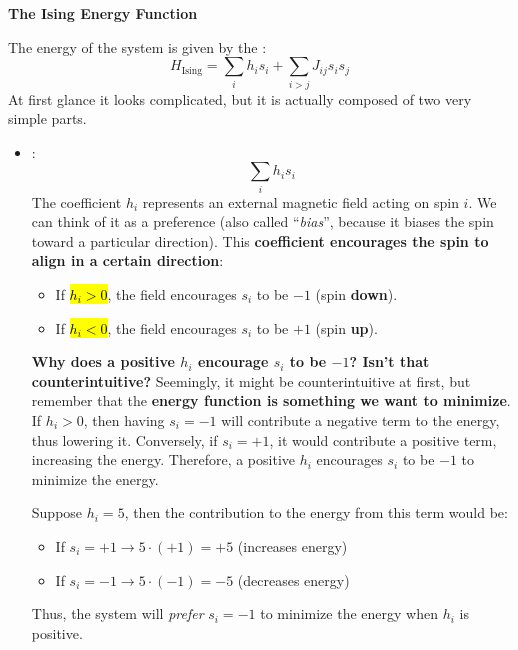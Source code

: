 \highspace
\begin{flushleft}
    \textcolor{Green3}{ \textbf{The Ising Energy Function}}
\end{flushleft}
The energy of the system is given by the :
\begin{equation}\label{eq:ising-energy-function}
    H_{\text{Ising}} = \sum_i h_i s_i + \sum_{i>j} J_{ij} s_i s_j
\end{equation}
At first glance it looks complicated, but it is actually composed of two very simple parts.
\begin{itemize}
    \item {}:
    \begin{equation*}
        \sum_i h_i s_i
    \end{equation*}
    The coefficient $h_i$ represents an external magnetic field acting on spin $i$. We can think of it as a preference (also called ``\emph{bias}'', because it biases the spin toward a particular direction). This \textbf{coefficient encourages the spin to align in a certain direction}:
    \begin{itemize}
        \item If \hl{$h_i > 0$}, the field encourages $s_i$ to be $-1$ (spin \textbf{down}).
        \item If \hl{$h_i < 0$}, the field encourages $s_i$ to be $+1$ (spin \textbf{up}).
    \end{itemize}
    \textcolor{Green3}{ \textbf{Why does a positive $h_i$ encourage $s_i$ to be $-1$? Isn't that counterintuitive?}} Seemingly, it might be counterintuitive at first, but remember that the \textbf{energy function is something we want to minimize}. If $h_i > 0$, then having $s_i = -1$ will contribute a negative term to the energy, thus lowering it. Conversely, if $s_i = +1$, it would contribute a positive term, increasing the energy. Therefore, a positive $h_i$ encourages $s_i$ to be $-1$ to minimize the energy.

    Suppose $h_i = 5$, then the contribution to the energy from this term would be:
    \begin{itemize}
        \item If $s_i = +1 \to 5 \cdot (+1) = +5$ (increases energy)
        \item If $s_i = -1 \to 5 \cdot (-1) = -5$ (decreases energy)
    \end{itemize}
    Thus, the system will \emph{prefer} $s_i = -1$ to minimize the energy when $h_i$ is positive.


\end{itemize}
